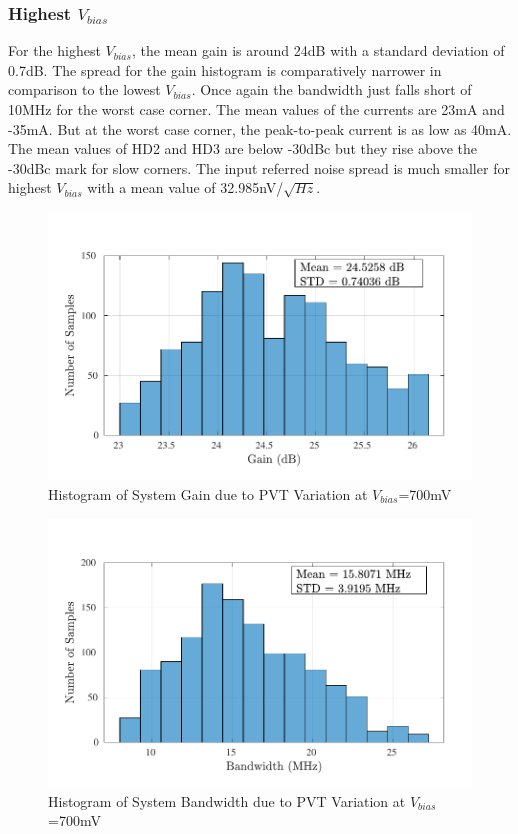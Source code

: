 \subsubsection{Highest $V_{bias}$}
For the highest $V_{bias}$, the mean gain is around 24dB with a standard deviation of 0.7dB. The spread for the gain histogram is comparatively narrower in comparison to the lowest $V_{bias}$. Once again the bandwidth just falls short of 10MHz for the worst case corner. The mean values of the currents are 23mA and -35mA. But at the worst case corner, the peak-to-peak current is as low as 40mA. The mean values of HD2 and HD3 are below -30dBc but they rise above the -30dBc mark for slow corners. The input referred noise spread is much smaller for highest $V_{bias}$ with a mean value of 32.985nV/$\sqrt{Hz}$.

\begin{figure} [H]
\centering
\includegraphics[scale=1]{Figures/Corners/Overall/PVT_Max/PDFs/PVT_Max_gain.pdf}
\caption{Histogram of System Gain due to PVT Variation at $V_{bias}$=700mV}
\end{figure}

\begin{figure} [H]
\centering
\includegraphics[scale=1]{Figures/Corners/Overall/PVT_Max/PDFs/PVT_Max_bw.pdf}
\caption{Histogram of System Bandwidth due to PVT Variation at $V_{bias}$=700mV}
\end{figure}

